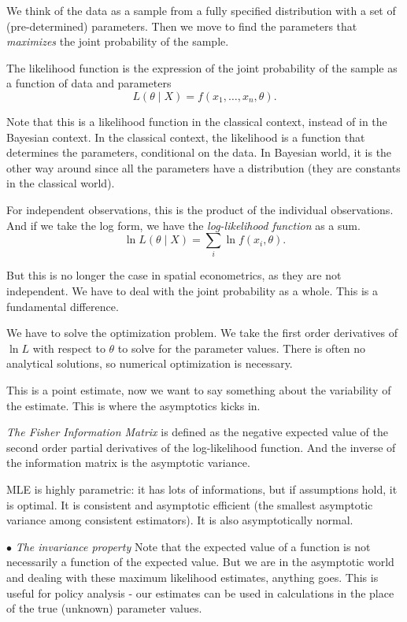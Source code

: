 \documentclass[11pt,a4paper]{amsart}
\theoremstyle{plain}
\theoremstyle{definition}
\begin{document}
We think of the data as a sample from a fully specified distribution with a set of (pre-determined) parameters. Then we move to find the parameters that \textit{maximizes} the joint probability of the sample.

The likelihood function is the expression of the joint probability of the sample as a function of data and parameters
\[	L(\theta \mid X) = f(x_{1}, \dots, x_{n}, \theta).	\]

Note that this is a likelihood function in the classical context, instead of in the Bayesian context. In the  classical context, the likelihood is a function that determines the parameters, conditional on the data. In Bayesian world, it is the other way around since all the parameters have a distribution (they are constants in the classical world).  

For independent observations, this is the product of the individual observations. And if we take the log form, we have the \textit{log-likelihood function} as a sum.
\[	\ln L(\theta \mid X) = \sum_{i} \ln f(x_{i}, \theta).	\]

But this is no longer the case in spatial econometrics, as they are not independent. We have to deal with the joint probability as a whole. This is a fundamental difference. 

We have to solve the optimization problem. We take the first order derivatives of $\ln L$ with respect to $\theta$ to solve for the parameter values. There is often no analytical solutions, so numerical optimization is necessary. 

This is a point estimate, now we want to say something about the variability of the estimate. This is where the asymptotics kicks in.
 
\textit{The Fisher Information Matrix} is defined as the negative expected value of the second order partial derivatives of the log-likelihood function. And the inverse of the information matrix is the asymptotic variance.  

MLE is highly parametric: it has lots of informations, but if assumptions hold, it is optimal. It is consistent and asymptotic efficient  (the smallest asymptotic variance among consistent estimators). It is also asymptotically normal.

$\bullet$ \textit{The invariance property} Note that the expected value of a function is not necessarily a function of the expected value.  But we are in the asymptotic world and dealing with these maximum likelihood estimates, anything goes. This is useful for policy analysis - our estimates can be used in calculations in the place of the true (unknown) parameter values.
\end{document}
